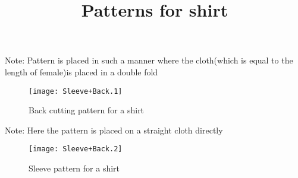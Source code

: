 \documentclass[a4paper]{article}
\begin{document}
\date{}
\title {Patterns for shirt}
\maketitle

Note: Pattern is placed in such a manner where the cloth(which is equal to the length of female)is placed in a double fold

\begin{figure}[!ht]

\texttt{[image: Sleeve+Back.1]}
\caption{Back cutting pattern for a shirt}

\end{figure}

Note: Here the pattern is placed on a straight cloth directly
\begin{figure}[!ht]

\texttt{[image: Sleeve+Back.2]}
\caption{Sleeve pattern for a shirt}

\end{figure}
\end{document}
